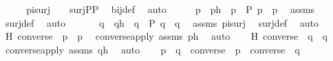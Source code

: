 \begin{isabellebody}
\ \ \isamarkupfalse%
\ \isamarkupfalse%
\ pisurj\ {\isacharcolon}{\kern0pt}\ {\isachardoublequoteopen}{\isasympi}\ {\isasymin}\ surj{\isacharparenleft}{\kern0pt}P{\isacharcomma}{\kern0pt}P{\isacharparenright}{\kern0pt}{\isachardoublequoteclose}\ \isamarkupfalse%
\ bij{\isacharunderscore}{\kern0pt}def\ \isamarkupfalse%
\ auto\isanewline
\ \ \isamarkupfalse%
\ \isamarkupfalse%
\ p{\isacharprime}{\kern0pt}\ \ p{\isacharprime}{\kern0pt}h\ {\isacharcolon}{\kern0pt}\ {\isachardoublequoteopen}p{\isacharprime}{\kern0pt}\ {\isasymin}\ P{\isachardoublequoteclose}\ {\isachardoublequoteopen}{\isasympi}{\isacharbackquote}{\kern0pt}p{\isacharprime}{\kern0pt}\ {\isacharequal}{\kern0pt}\ p{\isachardoublequoteclose}\ \isamarkupfalse%
\ assms\ \isamarkupfalse%
\ surj{\isacharunderscore}{\kern0pt}def\ \isamarkupfalse%
\ auto\ \isanewline
\ \ \isamarkupfalse%
\ \isamarkupfalse%
\ q{\isacharprime}{\kern0pt}\ \ q{\isacharprime}{\kern0pt}h\ {\isacharcolon}{\kern0pt}\ {\isachardoublequoteopen}q{\isacharprime}{\kern0pt}\ {\isasymin}\ P{\isachardoublequoteclose}\ {\isachardoublequoteopen}{\isasympi}{\isacharbackquote}{\kern0pt}q{\isacharprime}{\kern0pt}\ {\isacharequal}{\kern0pt}\ q{\isachardoublequoteclose}\ \isamarkupfalse%
\ assms\ pisurj\ \isamarkupfalse%
\ surj{\isacharunderscore}{\kern0pt}def\ \isamarkupfalse%
\ auto\ \isanewline
\ \ \isamarkupfalse%
\ H{}{\isacharcolon}{\kern0pt}\ {\isachardoublequoteopen}converse{\isacharparenleft}{\kern0pt}{\isasympi}{\isacharparenright}{\kern0pt}\ {\isacharbackquote}{\kern0pt}\ p\ {\isacharequal}{\kern0pt}\ p{\isacharprime}{\kern0pt}{\isachardoublequoteclose}\ \isamarkupfalse%
\ converse{\isacharunderscore}{\kern0pt}apply\ assms\ p{\isacharprime}{\kern0pt}h\ \isamarkupfalse%
\ auto\isanewline
\ \ \isamarkupfalse%
\ H{}{\isacharcolon}{\kern0pt}\ {\isachardoublequoteopen}converse{\isacharparenleft}{\kern0pt}{\isasympi}{\isacharparenright}{\kern0pt}\ {\isacharbackquote}{\kern0pt}\ q\ {\isacharequal}{\kern0pt}\ q{\isacharprime}{\kern0pt}{\isachardoublequoteclose}\ \isamarkupfalse%
\ converse{\isacharunderscore}{\kern0pt}apply\ assms\ q{\isacharprime}{\kern0pt}h\ \isamarkupfalse%
\ auto\isanewline
\ \ \isamarkupfalse%
\ {\isachardoublequoteopen}p\ {\isasympreceq}\ q\ {\isasymlongleftrightarrow}\ converse{\isacharparenleft}{\kern0pt}{\isasympi}{\isacharparenright}{\kern0pt}\ {\isacharbackquote}{\kern0pt}\ p\ {\isasympreceq}\ converse{\isacharparenleft}{\kern0pt}{\isasympi}{\isacharparenright}{\kern0pt}\ {\isacharbackquote}{\kern0pt}\ q{\isachardoublequoteclose}\ \isanewline

\end{isabellebody}
